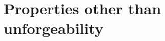 \documentclass{iacrtrans}
\theoremstyle{definition}
\numberwithin{theorem}{subsection}
\numberwithin{lemma}{theorem}
\begin{document}



\section{Properties other than  unforgeability}\label{otherProperties}
\end{document}
